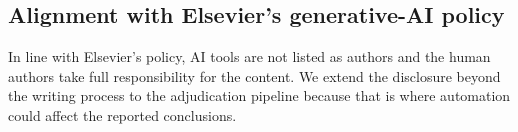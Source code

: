\subsection{Alignment with Elsevier's generative-AI policy}
\label{app:incidents:policy}
In line with Elsevier's policy, AI tools are not listed as authors and the human authors take full responsibility for the content. We extend the disclosure beyond the writing process to the adjudication pipeline because that is where automation could affect the reported conclusions.
